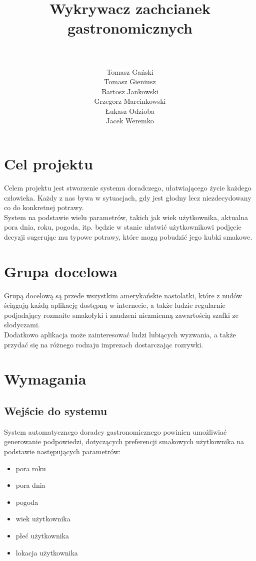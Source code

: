 \documentclass[a4paper,twoside,11pt]{article}
\author{\\ ~ \\ Tomasz Gański \\
Tomasz Gieniusz \\
Bartosz Jankowski\\
Grzegorz Marcinkowski\\
Łukasz Odzioba\\
Jacek Weremko}
\title{\LARGE Wykrywacz zachcianek gastronomicznych}
\begin{document}


\tableofcontents

\newpage

\section{Cel projektu}
Celem projektu jest stworzenie systemu doradczego, ułatwiającego życie każdego człowieka. Każdy z nas bywa w sytuacjach, gdy jest głodny lecz niezdecydowany co do konkretnej potrawy. \\ 

System na podstawie wielu parametrów, takich jak wiek użytkownika, aktualna pora dnia, roku, pogoda, itp. będzie w stanie ułatwić użytkownikowi podjęcie decyzji sugerując mu typowe potrawy, które mogą pobudzić jego kubki smakowe.

\section{Grupa docelowa}
Grupą docelową są przede wszystkim amerykańskie nastolatki, które z nudów ściągają każdą aplikację dostępną w internecie, a także ludzie regularnie podjadający rozmaite smakołyki i znudzeni niezmienną zawartością szafki ze słodyczami. \\

Dodatkowo aplikacja może zainteresować ludzi lubiących wyzwania, a także przydać się na różnego rodzaju imprezach dostarczając rozrywki.

\section{Wymagania}
\subsection{Wejście do systemu}
System automatycznego doradcy gastronomicznego powinien umożliwiać generowanie podpowiedzi, dotyczących preferencji smakowych użytkownika na podstawie następujących parametrów:
\begin{itemize}
\item pora roku
\item pora dnia
\item pogoda
\item wiek użytkownika
\item płeć użytkownika
\item lokacja użytkownika
\end{itemize}
\end{document}
